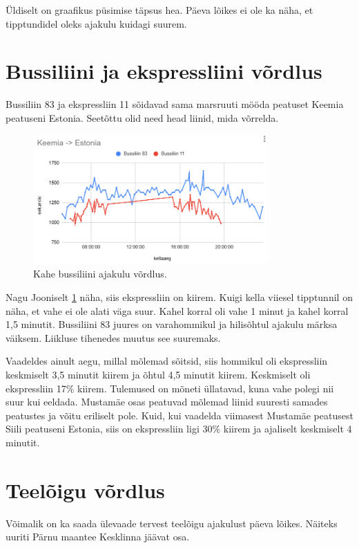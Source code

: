 Üldiselt on graafikus püsimise täpsus hea. Päeva lõikes ei ole ka näha, et tipptundidel oleks ajakulu kuidagi suurem.

\section{Bussiliini ja ekspressliini võrdlus}

Bussiliin 83 ja ekspressliin 11 sõidavad sama marsruuti mööda peatuset Keemia peatuseni Estonia. Seetõttu olid need head liinid, mida võrrelda.
\begin{figure}[h!]
    \centering
    \includegraphics[width=0.8\textwidth]{figures/keemia-estonia.png}
    \caption{Kahe bussiliini ajakulu võrdlus.}
    \label{fig:keemiaEstonia}
\end{figure}

Nagu Jooniselt \ref{fig:keemiaEstonia} näha, siis ekspressliin on kiirem. Kuigi kella viiesel tipptunnil on näha, et vahe ei ole alati väga suur. Kahel korral oli vahe 1 minut ja kahel korral 1,5 minutit. Bussiliini 83 juures on varahommikul ja hilisõhtul  ajakulu märksa väiksem. Liikluse tihenedes muutus see suuremaks. 

Vaadeldes ainult aegu, millal mõlemad sõitsid, siis hommikul oli ekspressliin keskmiselt 3,5 minutit kiirem ja õhtul 4,5 minutit kiirem. Keskmiselt oli ekspressliin 17\% kiirem. Tulemused on mõneti üllatavad, kuna vahe polegi nii suur kui eeldada. Mustamäe osas peatuvad mõlemad liinid suuresti samades peatustes ja võitu eriliselt pole. Kuid, kui vaadelda viimasest Mustamäe peatusest Siili peatuseni Estonia, siis on ekspressliin ligi 30\% kiirem ja ajaliselt keskmiselt 4 minutit.

\section{Teelõigu võrdlus}
Võimalik on ka saada ülevaade tervest teelõigu ajakulust päeva lõikes.
Näiteks uuriti Pärnu maantee Kesklinna jäävat osa.

